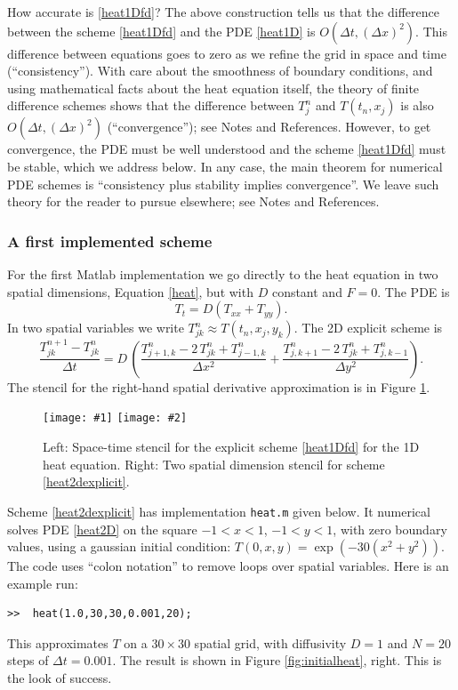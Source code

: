 \documentclass[titlepage,letterpaper,final,12pt]{scrartcl}
\newcommand{\twofigsizes}[5]{
\begin{figure}[ht]
\centering
\texttt{[image: \#1]} \quad
\texttt{[image: \#2]}
\caption{#3}
\label{fig:#1}
\end{figure}}
\newcommand{\twofig}[3]{\twofigsizes{#1}{#2}{#3}{2.5in}{2.5in}}
\begin{document}
How accurate is \eqref{heat1Dfd}?  The above construction tells us that the difference between the scheme \eqref{heat1Dfd} and the PDE \eqref{heat1D} is $O(\Delta t,(\Delta x)^2)$.  This difference between equations goes to zero as we refine the grid in space and time (``consistency'').  With care about the smoothness of boundary conditions, and using mathematical facts about the heat equation itself, the theory of finite difference schemes shows that the difference between $T_j^n$ and $T(t_n,x_j)$ is also $O(\Delta t,(\Delta x)^2)$ (``convergence''); see Notes and References.  However, to get convergence, the PDE must be well understood and the scheme \eqref{heat1Dfd} must be stable, which we address below.  In any case, the main theorem for numerical PDE schemes is ``consistency plus stability implies convergence''.  We leave such theory for the reader to pursue elsewhere; see Notes and References.

\subsubsection*{A first implemented scheme}  For the first Matlab implementation we go directly to the heat equation in two spatial dimensions, Equation \eqref{heat}, but with $D$ constant and $F=0$.  The PDE is
\begin{equation}
T_t = D (T_{xx}+T_{yy}).\label{heat2D}
\end{equation}
In two spatial variables we write $T_{jk}^n \approx T(t_n,x_j,y_k)$.  The 2D explicit scheme is
\begin{equation}
	\frac{T_{jk}^{n+1} - T_{jk}^n}{\Delta t} = D\,\left(\frac{T_{j+1,k}^n - 2\, T_{jk}^n + T_{j-1,k}^n}{\Delta x^2} + \frac{T_{j,k+1}^n - 2\, T_{jk}^n + T_{j,k-1}^n}{\Delta y^2}\right). \label{heat2dexplicit}
\end{equation}
The stencil for the right-hand spatial derivative approximation is in Figure \ref{fig:expstencil}.

\twofig{expstencil}{exp2dstencil}{Left: Space-time stencil for the explicit scheme \eqref{heat1Dfd} for the 1D heat equation.  Right: Two spatial dimension stencil for scheme \eqref{heat2dexplicit}.}

Scheme \eqref{heat2dexplicit} has implementation \texttt{heat.m} given below.  It numerical solves PDE \eqref{heat2D} on the square $-1 < x < 1$, $-1 < y < 1$, with zero boundary values, using a gaussian initial condition: $T(0,x,y) = \exp(-30 (x^2+y^2))$.  The code uses ``colon notation'' to remove loops over spatial variables.  Here is an example run:
\begin{Verbatim}
>>  heat(1.0,30,30,0.001,20);
\end{Verbatim}
This approximates $T$ on a $30\times 30$ spatial grid, with diffusivity $D=1$ and $N=20$ steps of $\Delta t = 0.001$.  The result is shown in Figure \ref{fig:initialheat}, right.  This is the look of success.
\end{document}
